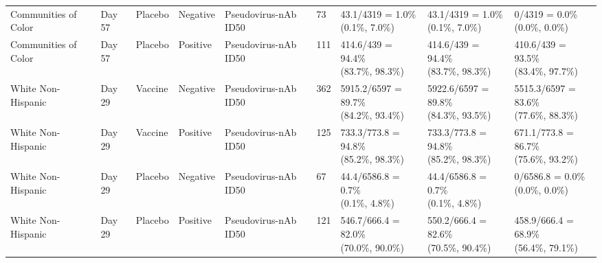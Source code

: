 \documentclass[]{book}
\theoremstyle{definition}
\theoremstyle{definition}
\theoremstyle{definition}
\newcommand{\1}{\mathbbm{1}}
\begin{document}
\begin{landscape}
\begin{ThreePartTable}
\begin{longtable}[t]{>{\raggedright\arraybackslash}p{2.7cm}llllllll}
\hspace{1em}Communities of Color & Day 57 & Placebo & Negative & Pseudovirus-nAb ID50 & 73 & \makecell[l]{43.1/4319 = 1.0\%\\(0.1\%, 7.0\%)} & \makecell[l]{43.1/4319 = 1.0\%\\(0.1\%, 7.0\%)} & \makecell[l]{0/4319 = 0.0\%\\(0.0\%, 0.0\%)}\\
\hspace{1em}Communities of Color & Day 57 & Placebo & Positive & Pseudovirus-nAb ID50 & 111 & \makecell[l]{414.6/439 = 94.4\%\\(83.7\%, 98.3\%)} & \makecell[l]{414.6/439 = 94.4\%\\(83.7\%, 98.3\%)} & \makecell[l]{410.6/439 = 93.5\%\\(83.4\%, 97.7\%)}\\
\hspace{1em}White Non-Hispanic & Day 29 & Vaccine & Negative & Pseudovirus-nAb ID50 & 362 & \makecell[l]{5915.2/6597 = 89.7\%\\(84.2\%, 93.4\%)} & \makecell[l]{5922.6/6597 = 89.8\%\\(84.3\%, 93.5\%)} & \makecell[l]{5515.3/6597 = 83.6\%\\(77.6\%, 88.3\%)}\\
\hspace{1em}White Non-Hispanic & Day 29 & Vaccine & Positive & Pseudovirus-nAb ID50 & 125 & \makecell[l]{733.3/773.8 = 94.8\%\\(85.2\%, 98.3\%)} & \makecell[l]{733.3/773.8 = 94.8\%\\(85.2\%, 98.3\%)} & \makecell[l]{671.1/773.8 = 86.7\%\\(75.6\%, 93.2\%)}\\
\hspace{1em}White Non-Hispanic & Day 29 & Placebo & Negative & Pseudovirus-nAb ID50 & 67 & \makecell[l]{44.4/6586.8 = 0.7\%\\(0.1\%, 4.8\%)} & \makecell[l]{44.4/6586.8 = 0.7\%\\(0.1\%, 4.8\%)} & \makecell[l]{0/6586.8 = 0.0\%\\(0.0\%, 0.0\%)}\\
\hspace{1em}White Non-Hispanic & Day 29 & Placebo & Positive & Pseudovirus-nAb ID50 & 121 & \makecell[l]{546.7/666.4 = 82.0\%\\(70.0\%, 90.0\%)} & \makecell[l]{550.2/666.4 = 82.6\%\\(70.5\%, 90.4\%)} & \makecell[l]{458.9/666.4 = 68.9\%\\(56.4\%, 79.1\%)}\\

\end{longtable}
\end{ThreePartTable}
\end{landscape}
\end{document}
